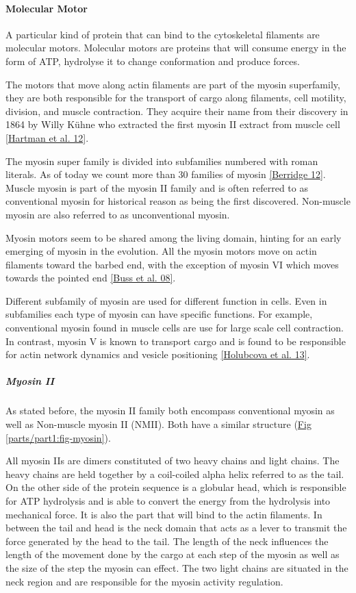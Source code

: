 \documentclass[A4paperpaper,11pt,english]{sphinxmanual}
\begin{document}
\paragraph{Molecular Motor}
\label{parts/part1:molecular-motor}
A particular kind of protein that can bind to the cytoskeletal filaments are
molecular motors. Molecular motors are proteins that will consume energy
in the form of ATP, hydrolyse it to change conformation and produce forces.

The motors that move along actin filaments are part of the myosin superfamily, they
are both responsible for the transport of cargo along filaments, cell motility,
division, and muscle contraction. They acquire their name from their discovery
in 1864 by Willy Kühne who extracted the first myosin II extract from muscle
cell {\hyperref[parts/part1:hartman2012]{{[}Hartman et al. 12{]}}}.

The myosin super family is divided into subfamilies numbered with roman literals.
As of today we count more than 30 families of myosin {\hyperref[parts/part1:berridge2012a]{{[}Berridge 12{]}}}.
Muscle myosin is part of the myosin II family and is often referred to  as
conventional myosin for historical reason as being the first discovered.
Non-muscle  myosin are also referred to as unconventional myosin.

Myosin motors seem to be shared among the living domain, hinting for an
early emerging of myosin in the evolution. All the myosin motors move on actin
filaments toward the barbed end, with the exception of myosin VI which moves
towards the pointed end {\hyperref[parts/part1:buss2008]{{[}Buss et al. 08{]}}}.

Different subfamily of myosin are used for different function in cells. Even in
subfamilies each type of myosin can have specific functions. For example,
conventional myosin found in muscle cells are use for large scale cell
contraction. In contrast, myosin V is known to transport cargo and is found to
be responsible for actin network dynamics and vesicle positioning
{\hyperref[parts/part1:holubcova2013]{{[}Holubcova et al. 13{]}}}.


\subparagraph{Myosin II}
\label{parts/part1:myosin-ii}\label{parts/part1:myoii}
As stated before, the myosin II family both encompass conventional myosin as
well as Non-muscle myosin II (NMII). Both have a similar structure (\hyperref[parts/part1:fig-myosin]{Fig  \ref*{parts/part1:fig-myosin}}).

All myosin IIs are dimers constituted of two heavy chains and light chains. The
heavy chains are held together by a coil-coiled alpha helix referred to as the
tail. On the other side of the protein sequence is a globular head, which is
responsible for ATP hydrolysis and is able to convert the energy from the
hydrolysis into mechanical force. It is also the part that will bind to the
actin filaments. In between the tail and head is the neck domain that acts as a
lever to transmit the force generated by the head to the tail. The length of
the neck influences the length of the movement done by the cargo at each step of
the myosin as well as the size of the step the myosin can effect. The two light
chains are situated in the neck region and are responsible for the myosin
activity regulation.
\end{document}

